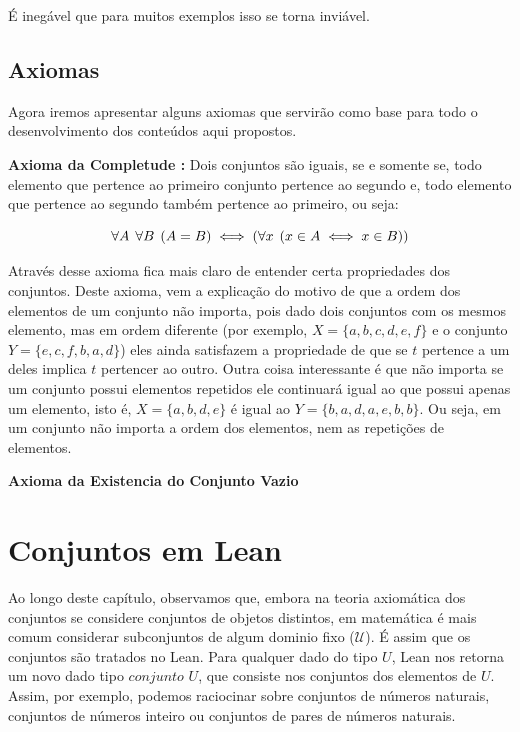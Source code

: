     É inegável que para muitos exemplos isso se torna inviável.
    
    \subsection{Axiomas}
    
    Agora iremos apresentar alguns axiomas que servirão como base para todo o desenvolvimento dos conteúdos aqui propostos.
    
    \textbf{Axioma da Completude :} Dois conjuntos são iguais, se e somente se, todo elemento que pertence ao primeiro conjunto pertence ao segundo e, todo elemento que pertence ao segundo também pertence ao primeiro, ou seja:
    
    \[\forall A \hspace{1.5mm} \forall B \hspace{1.5mm} (A=B) \iff (\forall x \hspace{1.5mm} (x \in A \iff x \in B))\]
    
    Através desse axioma fica mais claro de entender certa propriedades dos conjuntos. Deste axioma, vem a explicação do motivo de que a ordem dos elementos de um conjunto não importa, pois dado dois conjuntos com os mesmos elemento, mas em ordem diferente (por exemplo, $X=\{a,b,c,d,e,f\}$ e o conjunto $Y=\{e,c,f,b,a,d\}$) eles ainda satisfazem a propriedade de que se $t$ pertence a um deles implica $t$ pertencer ao outro. Outra coisa interessante é que não importa se um conjunto possui elementos repetidos ele continuará igual ao que possui apenas um elemento, isto é, $X=\{a,b,d,e\}$ é igual ao $Y=\{b,a,d,a,e,b,b\}$. Ou seja, em um conjunto não importa a ordem dos elementos, nem as repetições de elementos.
    
    \textbf{Axioma da Existencia do Conjunto Vazio}

\section{Conjuntos em Lean}
    
    Ao longo deste capítulo, observamos que, embora na teoria axiomática dos conjuntos se considere conjuntos de objetos distintos, em matemática é mais comum considerar subconjuntos de algum dominio fixo ($\mathcal U $). É assim que os conjuntos são tratados no Lean. Para qualquer dado do tipo $U$, Lean nos retorna um novo dado tipo $conjunto$ $U$, que consiste nos conjuntos dos elementos de $U$. Assim, por exemplo, podemos raciocinar sobre conjuntos de números naturais, conjuntos de números inteiro ou conjuntos de pares de números naturais.

